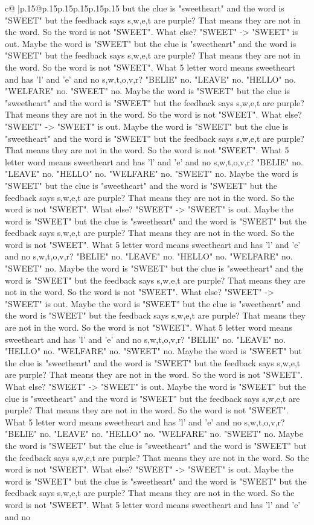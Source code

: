 \documentclass{article}
\begin{document}
{\begin{supertabular}{c@{$\;$}|p{.15\linewidth}@{}p{.15\linewidth}p{.15\linewidth}p{.15\linewidth}p{.15\linewidth}p{.15\linewidth}}
{{{but the clue is "sweetheart" and the word is "SWEET" but the feedback says s,w,e,t are purple? That means they are not in the word. So the word is not "SWEET". What else? "SWEET" {-}> "SWEET" is out. Maybe the word is "SWEET" but the clue is "sweetheart" and the word is "SWEET" but the feedback says s,w,e,t are purple? That means they are not in the word. So the word is not "SWEET". What 5 letter word means sweetheart and has 'l' and 'e' and no s,w,t,o,v,r? "BELIE" no. "LEAVE" no. "HELLO" no. "WELFARE" no. "SWEET" no. Maybe the word is "SWEET" but the clue is "sweetheart" and the word is "SWEET" but the feedback says s,w,e,t are purple? That means they are not in the word. So the word is not "SWEET". What else? "SWEET" {-}> "SWEET" is out. Maybe the word is "SWEET" but the clue is "sweetheart" and the word is "SWEET" but the feedback says s,w,e,t are purple? That means they are not in the word. So the word is not "SWEET". What 5 letter word means sweetheart and has 'l' and 'e' and no s,w,t,o,v,r? "BELIE" no. "LEAVE" no. "HELLO" no. "WELFARE" no. "SWEET" no. Maybe the word is "SWEET" but the clue is "sweetheart" and the word is "SWEET" but the feedback says s,w,e,t are purple? That means they are not in the word. So the word is not "SWEET". What else? "SWEET" {-}> "SWEET" is out. Maybe the word is "SWEET" but the clue is "sweetheart" and the word is "SWEET" but the feedback says s,w,e,t are purple? That means they are not in the word. So the word is not "SWEET". What 5 letter word means sweetheart and has 'l' and 'e' and no s,w,t,o,v,r? "BELIE" no. "LEAVE" no. "HELLO" no. "WELFARE" no. "SWEET" no. Maybe the word is "SWEET" but the clue is "sweetheart" and the word is "SWEET" but the feedback says s,w,e,t are purple? That means they are not in the word. So the word is not "SWEET". What else? "SWEET" {-}> "SWEET" is out. Maybe the word is "SWEET" but the clue is "sweetheart" and the word is "SWEET" but the feedback says s,w,e,t are purple? That means they are not in the word. So the word is not "SWEET". What 5 letter word means sweetheart and has 'l' and 'e' and no s,w,t,o,v,r? "BELIE" no. "LEAVE" no. "HELLO" no. "WELFARE" no. "SWEET" no. Maybe the word is "SWEET" but the clue is "sweetheart" and the word is "SWEET" but the feedback says s,w,e,t are purple? That means they are not in the word. So the word is not "SWEET". What else? "SWEET" {-}> "SWEET" is out. Maybe the word is "SWEET" but the clue is "sweetheart" and the word is "SWEET" but the feedback says s,w,e,t are purple? That means they are not in the word. So the word is not "SWEET". What 5 letter word means sweetheart and has 'l' and 'e' and no s,w,t,o,v,r? "BELIE" no. "LEAVE" no. "HELLO" no. "WELFARE" no. "SWEET" no. Maybe the word is "SWEET" but the clue is "sweetheart" and the word is "SWEET" but the feedback says s,w,e,t are purple? That means they are not in the word. So the word is not "SWEET". What else? "SWEET" {-}> "SWEET" is out. Maybe the word is "SWEET" but the clue is "sweetheart" and the word is "SWEET" but the feedback says s,w,e,t are purple? That means they are not in the word. So the word is not "SWEET". What 5 letter word means sweetheart and has 'l' and 'e' and no }}}
\end{supertabular}}
\end{document}
